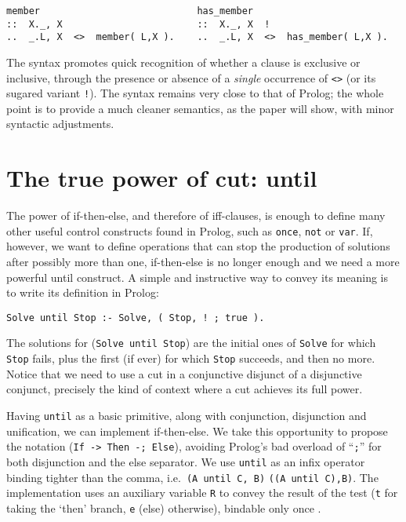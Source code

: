 \documentclass{tlp}
\begin{document}
\vspace{-3.7pt}
\begin{verbatim}
member                            has_member
::  X._, X                        ::  X._, X  !
..  _.L, X  <>  member( L,X ).    ..  _.L, X  <>  has_member( L,X ).
\end{verbatim}
\vspace{-3.7pt} The syntax promotes quick recognition of whether a clause is
exclusive or inclusive, through the presence or absence of a \emph{single}
occurrence of \texttt{<>} (or its
sugared variant
\texttt{!}). The syntax remains very close to that of Prolog; the whole point is
to provide a much cleaner semantics, as the paper will show, with minor syntactic
adjustments.

\section{The true power of cut: \textsf{until}}
\label{sec:until}

The power of \textsf{if-then-else}, and therefore of iff-clauses, is enough to define many other useful
control constructs found in Prolog, such as \texttt{once}, \texttt{not}
or \texttt{var}. If, however, we want to define operations that can stop the production of
solutions after possibly more than one, \textsf{if-then-else} is no
longer enough and we need a more powerful \textsf{until} construct. A
simple and instructive way to convey its meaning is to write its
definition in Prolog:

\vspace{-3.7pt}
\begin{verbatim}
Solve until Stop :- Solve, ( Stop, ! ; true ).
\end{verbatim}
\vspace{-3.7pt}
The solutions for (\texttt{Solve until Stop}) are the initial ones of \verb+Solve+ for
which \verb+Stop+ fails, plus
the first (if ever) for which \verb+Stop+ succeeds, and then no more. Notice
that we need to use a cut in a conjunctive disjunct of a disjunctive conjunct,
precisely the kind of context where a cut achieves its full power.

Having \texttt{until} as a basic primitive, along with conjunction,
disjunction and unification, we can implement \textsf{if-then-else}. We take this
opportunity to propose the notation (\texttt{If -> Then -; Else}), avoiding
Prolog's bad overload of ``\verb+;+'' for both disjunction and the
\textsf{else} separator. We use \texttt{until} as an infix operator binding
tighter than the comma, i.e.\ \texttt{(A until C, B)}  \texttt{((A until
  C),B)}. The implementation uses an auxiliary variable \texttt{R} to
convey the result of the test (\texttt{t} for taking the
`\textsf{then}' branch, \texttt{e} (\textsf{else}) otherwise), bindable only once
.
\end{document}
